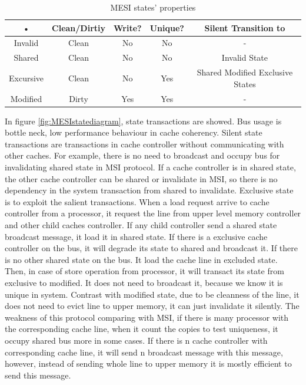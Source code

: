\begin{table}[position specifier]
\centering
\begin{tabular}{|c|c|c|c|c|}
\hline 
• & Clean/Dirtiy & Write? & Unique? & Silent Transition to \\ 
\hline 
Invalid & Clean & No & No & - \\ 
\hline 
Shared & Clean & No & No & Invalid State \\ 
\hline 
Excursive & Clean & No & Yes & Shared Modified Exclusive States \\ 
\hline 
Modified & Dirty & Yes & Yes & - \\ 
\hline 
\end{tabular} 
\caption{MESI states' properties}
\label{tab:MESItable}
\end{table}

In figure \ref{fig:MESIstatediagram}, state transactions are showed. Bus usage is bottle neck, low performance behaviour in cache coherency. Silent state transactions are transactions in cache controller without communicating with other caches. For example, there is no need to broadcast and occupy bus for invalidating shared state in MSI protocol. If a cache controller is in shared state, the other cache controller can be shared or invalidate in MSI, so there is no dependency in the system transaction from shared to invalidate. Exclusive state is to exploit the salient transactions. When a load request arrive to cache controller from a processor, it request the line from upper level memory controller and other child caches controller. If any child controller send a shared state broadcast message, it load it in shared state. If there is a exclusive cache controller on the bus, it will degrade its state to shared and broadcast it. If there is no other shared state on the bus. It load the cache line in excluded state. Then, in case of store operation from processor, it will transact its state from exclusive to modified. It does not need to broadcast it, because we know it is unique in system. Contrast with modified state, due to be cleanness of the line, it does not need to evict line to upper memory, it can  just invalidate it silently. The weakness of this protocol comparing with MSI, if there is many processor with the corresponding cache line, when it count the copies to test uniqueness, it occupy shared bus more in some cases. If there is n cache controller with corresponding cache line, it will send n broadcast message with this message, however, instead of sending whole line to upper memory it is mostly efficient to send this message.

